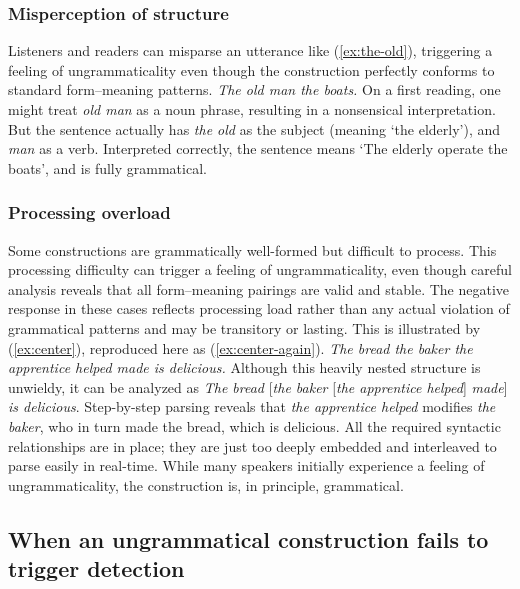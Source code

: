 \documentclass[12pt,letterpaper]{article}
\begin{document}
\subsubsection{Misperception of structure}

Listeners and readers can misparse an utterance like (\ref{ex:the-old}), triggering a feeling of ungrammaticality even though the construction perfectly conforms to standard form--meaning patterns.
\ea
\textit{The old man the boats.} \autocite{ritchie1984}\label{ex:the-old}
\z
On a first reading, one might treat \textit{old man} as a noun phrase, resulting in a nonsensical interpretation. But the sentence actually has \textit{the old} as the subject (meaning `the elderly'), and \textit{man} as a verb. Interpreted correctly, the sentence means `The elderly operate the boats', and is fully grammatical.


\subsubsection{Processing overload}

Some constructions are grammatically well-formed but difficult to process. This processing difficulty can trigger a feeling of ungrammaticality, even though careful analysis reveals that all form--meaning pairings are valid and stable. The negative response in these cases reflects processing load rather than any actual violation of grammatical patterns and may be transitory or lasting. This is illustrated by (\ref{ex:center}), reproduced here as (\ref{ex:center-again}).
\ea
\textit{The bread the baker the apprentice helped made is delicious.}\label{ex:center-again}
\z
Although this heavily nested structure is unwieldy, it can be analyzed as  \textit{The bread} [\textit{the baker} [\textit{the apprentice helped}] \textit{made}] \textit{is delicious}. Step-by-step parsing reveals that \textit{the apprentice helped} modifies \textit{the baker}, who in turn made the bread, which is delicious. All the required syntactic relationships are in place; they are just too deeply embedded and interleaved to parse easily in real-time. While many speakers initially experience a feeling of ungrammaticality, the construction is, in principle, grammatical.

\subsection{When an ungrammatical construction fails to trigger detection}\label{sec:wrongly-grammatical}
\end{document}
